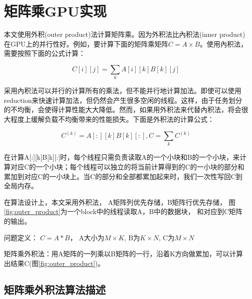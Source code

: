 \chapter{矩阵乘GPU实现}\label{chap:GEMMGPU}

本文使用外积(outer product)法计算矩阵乘。因为外积法比內积法(inner product)在GPU上的并行性好。例如，要计算下面的矩阵乘矩阵$C=A \times B$。使用內积法，需要按照下面的公式计算：

\begin{equation}
\label{eq:innerproduct}
C[i][j]=\sum_{k}A[i][k]B[k][j]
\end{equation}

采用內积法可以并行的计算所有的乘法，但不能并行地计算加法。即使可以使用reduction来快速计算加法，但仍然会产生很多空闲的线程。这样，由于任务划分的不均衡，会使得计算性能大大降低。然而，如果用外积法来代替內积法，将会很大程度上缓解负载不均衡带来的性能损失。下面是外积法的计算公式：

\begin{equation}
\label{eq:outerproduct}
C^{(k)}=A[:][k]B[k][:], C=\sum_{k}C^{(k)}
\end{equation}

在计算A[:][k]B[k][:]时，每个线程只需负责读取A的一个小块和B的一个小块，来计算对应C的一个小块；每个线程可以独立的将当前计算得到的C的一小块的部分和累加到对应C的一小块上。当C的部分和全部都累加起来时，我们一次性写回C到全局内存。

在算法设计上，本文采用外积法， A矩阵列优先存储，B矩阵行优先存储， 图\ref{fig:outer_product}为一个block中的线程读取A，B中的数据块， 和对应到C矩阵的输出。

问题定义： $C = A * B$， A大小为$M \times K$, B为$K \times N$, C为$M \times N$

矩阵乘外积法：用A矩阵的一列乘以B矩阵的一行，沿着K方向做累加，可以计算出结果C(图\ref{fig:outer_product})。

\section{矩阵乘外积法算法描述}

